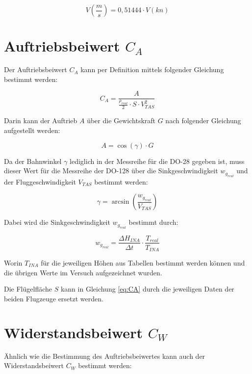 \begin{equation}
V\left(\frac{m}{s}\right)=0,51444 \cdot V\left(kn\right)
\label{eq:V_Umrechnung}
\end{equation}


\section{Auftriebsbeiwert $C_A$}

Der Auftriebsbeiwert $C_A$ kann per Definition mittels folgender Gleichung bestimmt werden\cite{Skript}:

\begin{equation}
C_A=\frac{A}{\frac{\rho_{real}}{2} \cdot S \cdot V_{TAS}^2}
\label{eq:CA}
\end{equation}

Darin kann der Auftrieb $A$ über die Gewichtskraft $G$ nach folgender Gleichung aufgestellt werden:

\begin{equation}
A=\cos(\gamma) \cdot G
\label{eq:A}
\end{equation}

Da der Bahnwinkel $\gamma$ lediglich in der Messreihe für die DO-28 gegeben ist, muss dieser Wert für die Messreihe der DO-128 über die Sinkgeschwindigkeit $w_{g_{real}}$ und der Fluggeschwindigkeit $V_{TAS}$ bestimmt werden:

\begin{equation}
\gamma=\arcsin\left(\frac{w_{g_{real}}}{V_{TAS}}\right)
\label{eq:gamma}
\end{equation} 

Dabei wird die Sinkgeschwindigkeit $w_{g_{real}}$ bestimmt durch\cite{Kurzskript}:

\begin{equation}
w_{g_{real}}=\frac{\Delta H_{INA}}{\Delta t} \cdot \frac{T_{real}}{T_{INA}}
\end{equation}

Worin $T_{INA}$ für die jeweiligen Höhen aus Tabellen bestimmt werden können und die übrigen Werte im Versuch aufgezeichnet wurden.

Die Flügelfläche $S$ kann in Gleichung \ref{eq:CA} durch die jeweiligen Daten der beiden Flugzeuge ersetzt werden.

\section{Widerstandsbeiwert $C_W$}

Ähnlich wie die Bestimmung des Auftriebsbeiwertes kann auch der Widerstandsbeiwert $C_W$ bestimmt werden:

